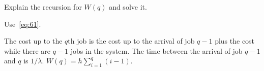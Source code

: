 \begin{exercise}\label{ex:nmm-4}
Explain the  recursion for $W(q)$ and solve it.
\begin{hint}
  Use~\cref{eq:61}.
\end{hint}
\begin{solution}
  The cost up to the $q$th job is the cost up to the arrival of job $q-1$ plus the cost while there are $q-1$ jobs in the system.
  The time between the arrival of job $q-1$ and $q$ is $1/\lambda$.  $W(q) = h\sum_{i=1}^q (i-1)$.
\end{solution}
\end{exercise}




